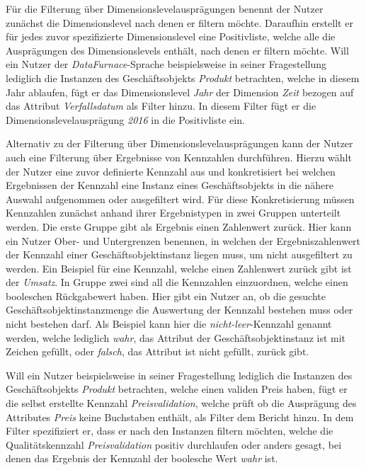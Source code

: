 \documentclass[
  language=german, %
  type=bachelor%
]{isthesis}
\begin{document}
\begin{content}
  Für die Filterung über Dimensionslevelausprägungen benennt der Nutzer
  zunächst die Dimensionslevel nach denen er filtern möchte. Daraufhin erstellt
  er für jedes zuvor spezifizierte Dimensionslevel eine Positivliste, welche
  alle die Ausprägungen des Dimensionslevels enthält, nach denen er filtern
  möchte. Will ein Nutzer der \textit{DataFurnace}-Sprache beispielsweise in
  seiner Fragestellung lediglich die Instanzen des Geschäftsobjekts
  \textit{Produkt} betrachten, welche in diesem Jahr ablaufen, fügt er das
  Dimensionslevel \textit{Jahr} der Dimension \textit{Zeit} bezogen auf das
  Attribut \textit{Verfallsdatum} als Filter hinzu. In diesem Filter fügt er
  die Dimensionslevelausprägung \textit{2016} in die Positivliste ein.

  Alternativ zu der Filterung über Dimensionslevelausprägungen kann der Nutzer
  auch eine Filterung über Ergebnisse von Kennzahlen durchführen. Hierzu wählt
  der Nutzer eine zuvor definierte Kennzahl aus und konkretisiert bei welchen
  Ergebnissen der Kennzahl eine Instanz eines Geschäftsobjekts in die nähere
  Auswahl aufgenommen oder ausgefiltert wird. Für diese Konkretisierung müssen
  Kennzahlen zunächst anhand ihrer Ergebnistypen in zwei Gruppen unterteilt werden. Die
  erste Gruppe gibt als Ergebnis einen Zahlenwert zurück. Hier kann ein Nutzer
  Ober- und Untergrenzen benennen, in welchen der Ergebniszahlenwert der
  Kennzahl einer Geschäftsobjektinstanz liegen muss, um nicht ausgefiltert zu
  werden. Ein Beispiel für eine Kennzahl, welche einen Zahlenwert zurück gibt
  ist der \textit{Umsatz}. In Gruppe zwei sind all die Kennzahlen einzuordnen,
  welche einen booleschen Rückgabewert haben. Hier gibt ein Nutzer an, ob die
  gesuchte Geschäftsobjektinstanzmenge die Auswertung der Kennzahl bestehen
  muss oder nicht bestehen darf. Als Beispiel kann hier die
  \textit{nicht-leer}-Kennzahl genannt werden, welche lediglich \textit{wahr},
  das Attribut der Geschäftsobjektinstanz ist mit Zeichen gefüllt, oder
  \textit{falsch}, das Attribut ist nicht gefüllt, zurück gibt.

  Will ein Nutzer beispielsweise in seiner Fragestellung lediglich die
  Instanzen des Geschäftsobjekts \textit{Produkt} betrachten, welche einen
  validen Preis haben, fügt er die selbst erstellte Kennzahl
  \textit{Preisvalidation}, welche prüft ob die Ausprägung des Attributes
  \textit{Preis} keine Buchstaben enthält, als Filter dem Bericht hinzu. In dem
  Filter spezifiziert er, dass er nach den Instanzen filtern möchten, welche
  die Qualitätskennzahl \textit{Preisvalidation} positiv durchlaufen oder
  anders gesagt, bei denen das Ergebnis der Kennzahl der boolesche Wert
  \textit{wahr} ist.


\end{content}
\end{document}
